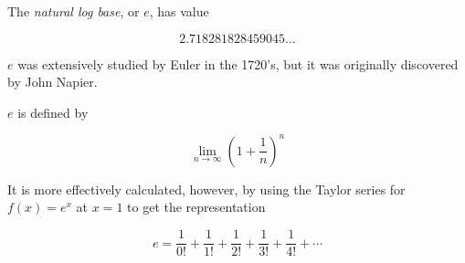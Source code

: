 \documentclass[12pt]{article}
\begin{document}
The \emph{natural log base}, or $e$, has value 

\[ 2.718281828459045\ldots \]

$e$ was extensively studied by Euler in the 1720's, but it was originally discovered by John Napier. 

$e$ is defined by 

\[ \lim_{n \rightarrow \infty} \left(1+\frac{1}{n}\right)^n \]

It is more effectively calculated, however, by using the Taylor series for $f(x)=e^x$ at $x=1$ to get the representation 

\[ e = \frac{1}{0!} + \frac{1}{1!} + \frac{1}{2!} + \frac{1}{3!} + \frac{1}{4!} + \cdots \]
\end{document}
